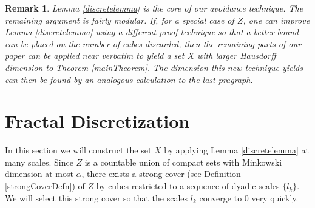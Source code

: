 \documentclass[dvipsnames,letterpaper,12pt]{article}
\numberwithin{equation}{section}
\theoremstyle{plain}
\newtheorem*{remark}{Remark}
\begin{document}
\begin{remark}
	Lemma \ref{discretelemma} is the core of our avoidance technique. The remaining argument is fairly modular. If, for a special case of $Z$, one can improve Lemma \ref{discretelemma} using a different proof technique so that a better bound can be placed on the number of cubes discarded, then the remaining parts of our paper can be applied near verbatim to yield a set $X$ with larger Hausdorff dimension to Theorem \ref{mainTheorem}. The dimension this new technique yields can then be found by an analogous calculation to the last pragraph.
\end{remark}










\section{Fractal Discretization}\label{discretizationsection}
In this section we will construct the set $X$ by applying Lemma \ref{discretelemma} at many scales. Since $Z$ is a countable union of compact sets with Minkowski dimension at most $\alpha$, there exists a strong cover (see Definition \ref{strongCoverDefn}) of $Z$ by cubes restricted to a sequence of dyadic scales $\{ l_k \}$. We will select this strong cover so that the scales $l_k$ converge to 0 very quickly.
\end{document}
